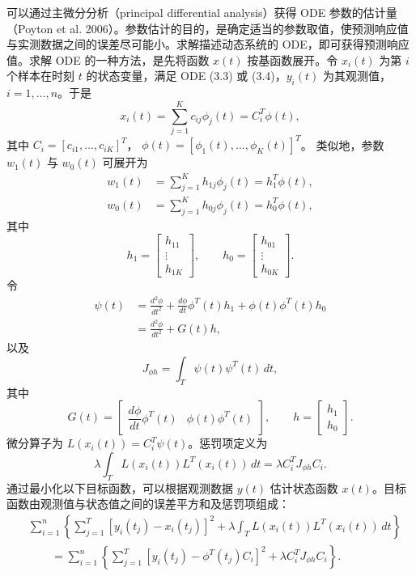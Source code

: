 可以通过主微分分析（principal differential analysis）获得 ODE 参数的估计量（Poyton et al. 2006）。参数估计的目的，是确定适当的参数取值，使预测响应值与实测数据之间的误差尽可能小。求解描述动态系统的 ODE，即可获得预测响应值。求解 ODE 的一种方法，是先将函数 $x(t)$ 按基函数展开。令 $x_i(t)$ 为第 $i$ 个样本在时刻 $t$ 的状态变量，满足 ODE (3.3) 或 (3.4)，$y_i(t)$ 为其观测值，$i=1,\ldots,n$。于是
\begin{equation}
x_i(t)=\sum_{j=1}^Kc_{ij}\phi_j(t)=C_i^T\phi(t),
\tag{3.6}
\end{equation}
其中 $C_i=[c_{i1},\ldots,c_{iK}]^T$，
$\phi(t)=[\phi_1(t),\ldots,\phi_K(t)]^T$。
类似地，参数 $w_1(t)$ 与 $w_0(t)$ 可展开为
\begin{equation}
\begin{aligned}
w_1(t)&=\sum_{j=1}^Kh_{1j}\phi_j(t)=h_1^T\phi(t),\\
w_0(t)&=\sum_{j=1}^Kh_{0j}\phi_j(t)=h_0^T\phi(t),
\end{aligned}
\tag{3.7}
\end{equation}
其中
\[
h_1=\begin{bmatrix}h_{11}\\\vdots\\h_{1K}\end{bmatrix},
\qquad
h_0=\begin{bmatrix}h_{01}\\\vdots\\h_{0K}\end{bmatrix}.
\]
令
\[
\begin{aligned}
\psi(t)
&=\frac{d^2\phi}{dt^2}
 +\frac{d\phi}{dt}\phi^T(t)h_1+\phi(t)\phi^T(t)h_0\\
&=\frac{d^2\phi}{dt^2}+G(t)h,
\end{aligned}
\]
以及
\[
J_{\phi h}=\int_T\psi(t)\psi^T(t)\,dt,
\]
其中
\[
G(t)=\begin{bmatrix}
\dfrac{d\phi}{dt}\phi^T(t)&\phi(t)\phi^T(t)
\end{bmatrix},
\qquad
h=\begin{bmatrix}h_1\\h_0\end{bmatrix}.
\]
微分算子为 $L(x_i(t))=C_i^T\psi(t)$。惩罚项定义为
\begin{equation}
\lambda\int_TL(x_i(t))L^T(x_i(t))\,dt
=\lambda C_i^TJ_{\phi h}C_i.
\tag{3.8}
\end{equation}
通过最小化以下目标函数，可以根据观测数据 $y(t)$ 估计状态函数 $x(t)$。目标函数由观测值与状态值之间的误差平方和及惩罚项组成：
\begin{equation}
\begin{aligned}
&\sum_{i=1}^n\left\{
\sum_{j=1}^T[y_i(t_j)-x_i(t_j)]^2
 +\lambda\int_TL(x_i(t))L^T(x_i(t))\,dt\right\}\\
&\qquad=\sum_{i=1}^n\left\{
\sum_{j=1}^T[y_i(t_j)-\phi^T(t_j)C_i]^2
 +\lambda C_i^TJ_{\phi h}C_i\right\}.
\end{aligned}
\tag{3.9}
\end{equation}
